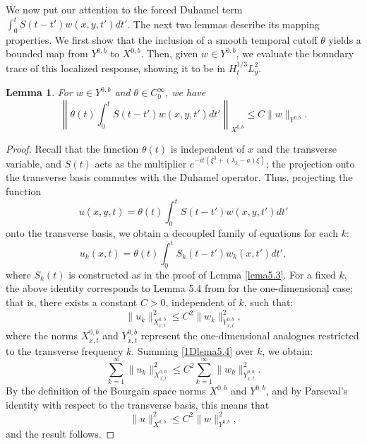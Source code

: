 \documentclass[11pt]{article}
\numberwithin{equation}{section}
\newtheorem{lemma}{Lemma}
\begin{document}
We now put our attention to the forced Duhamel term $\int_0^t S(t-t')w(x,y,t')dt'$. The next two lemmas describe its mapping properties. We first show that the inclusion of a smooth temporal cutoff $\theta$ yields a bounded map from $Y^{0,b}$ to $X^{0,b}$. Then, given $w \in Y^{0,b}$, we evaluate the boundary trace of this localized response, showing it to be in $H^{1/3}_t L^2_y$.

\begin{lemma}
For $w\in Y^{0,b}$ and $\theta \in C_{0}^{\infty}$, we have
\begin{equation}
\left\|\theta(t)\int_{0}^{t} S(t-t')w(x,y,t')dt'\right\|_{X^{0,b}}\leq C\|w\|_{Y^{0,b}}.
\end{equation}
\end{lemma}
\begin{proof}
Recall that the function $\theta(t)$ is independent of $x$ and the transverse variable, and $S(t)$ acts as the multiplier $e^{-it(\xi^{3}+(\lambda_{k}-a)\xi)}$; the projection onto the transverse basis commutes with the Duhamel operator. Thus, projecting the function
\begin{equation}u(x,y,t) = \theta(t)\int_{0}^{t} S(t-t')w(x,y,t')dt'\end{equation} onto the transverse basis, we obtain a decoupled family of equations for each $k$:
\begin{equation}u_{k}(x,t) = \theta(t)\int_{0}^{t} S_{k}(t-t')w_{k}(x,t')dt',\end{equation} where $S_{k}(t)$ is constructed as in the proof of Lemma \ref{lema5.3}. For a fixed $k$, the above identity corresponds to Lemma 5.4 from \cite{CK} for the one-dimensional case; that is, there exists a constant $C > 0$, independent of $k$, such that:
\begin{equation}\label{1Dlema5.4}
\|u_{k}\|_{X^{0,b}_{x,t}}^{2} \leq C^{2} \|w_{k}\|_{Y^{0,b}_{x,t}}^{2},\end{equation}
where the norms $X^{0,b}_{x,t}$ and $Y^{0,b}_{x,t}$ represent the one-dimensional analogues restricted to the transverse frequency $k$. Summing \eqref{1Dlema5.4} over $k$, we obtain:
\begin{equation}\sum_{k=1}^{\infty} \|u_{k}\|_{X^{0,b}_{x,t}}^{2} \leq C^{2} \sum_{k=1}^{\infty} \|w_{k}\|_{Y^{0,b}_{x,t}}^{2}.\end{equation}
By the definition of the Bourgain space norms $X^{0,b}$ and $Y^{0,b}$, and by Parseval's identity with respect to the transverse basis, this means that
\begin{equation}
\|u\|_{X^{0,b}}^{2} \leq C^{2} \|w\|_{Y^{0,b}}^{2},\end{equation} and the result follows.
\end{proof}
\end{document}
